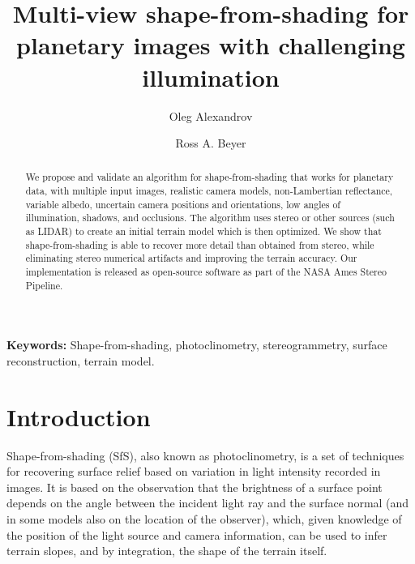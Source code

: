 \documentclass[12pt,oneside]{article}
\begin{document}
\title{Multi-view shape-from-shading for planetary images with
   challenging illumination}

 \author[1]{\rm Oleg Alexandrov}
 \author[1,2]{\rm Ross A. Beyer}



\maketitle

\begin{acronym}
\end{acronym}

\begin{abstract}
  We propose and validate an algorithm for shape-from-shading that works
  for planetary data, with multiple input images, realistic camera
  models, non-Lambertian reflectance, variable albedo, uncertain camera
  positions and orientations, low angles of illumination, shadows, and
  occlusions. The algorithm uses stereo or other sources (such as LIDAR)
  to create an initial terrain model which is then optimized. We show
  that shape-from-shading is able to recover more detail than
  obtained from stereo, while eliminating stereo numerical artifacts and
  improving the terrain accuracy. Our implementation is released as
  open-source software as part of the NASA Ames Stereo Pipeline.
\end{abstract}

{\bf Keywords:} Shape-from-shading, photoclinometry, stereogrammetry,
surface reconstruction, terrain model.

\section{Introduction}

Shape-from-shading (SfS), also known as photoclinometry, is a set of
techniques for recovering surface relief based on variation in light
intensity recorded in images. It is based on the observation that the
brightness of a surface point depends on the angle between the incident
light ray and the surface normal (and in some models also on the
location of the observer), which, given knowledge of the position of the
light source and camera information, can be used to infer terrain slopes,
and by integration, the shape of the terrain itself.
\end{document}
